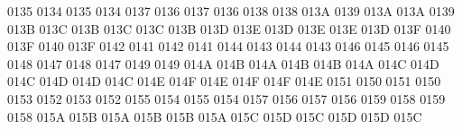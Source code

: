  0135 0134 %
 0135 0134 %
 0137 0136 %
 0137 0136 %
 0138 0138 %
 013A 0139 %
\setcclcucx 013A 013A 0139 %
\setcclcucx 013B 013C 013B %
\setcclcucx 013C 013C 013B %
\setcclcucx 013D 013E 013D %
\setcclcucx 013E 013E 013D %
\setcclcucx 013F 0140 013F %
 0140 013F %
 0142 0141 %
 0142 0141 %
 0144 0143 %
 0144 0143 %
 0146 0145 %
 0146 0145 %
 0148 0147 %
 0148 0147 %
 0149 0149 %
\setcclcucx 014A 014B 014A %
\setcclcucx 014B 014B 014A %
\setcclcucx 014C 014D 014C %
\setcclcucx 014D 014D 014C %
\setcclcucx 014E 014F 014E %
\setcclcucx 014F 014F 014E %
 0151 0150 %
 0151 0150 %
 0153 0152 %
 0153 0152 %
 0155 0154 %
 0155 0154 %
 0157 0156 %
 0157 0156 %
 0159 0158 %
 0159 0158 %
\setcclcucx 015A 015B 015A %
\setcclcucx 015B 015B 015A %
\setcclcucx 015C 015D 015C %
\setcclcucx 015D 015D 015C %
